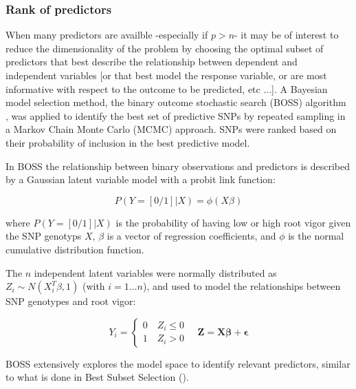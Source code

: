 \subsubsection{Rank of predictors}
\label{par:boss}
When many predictors are availble -especially if $p>n$- it may be
of interest to reduce the dimensionality of the problem by choosing the
optimal subset of predictors that best describe the relationship between
dependent and independent variables [or that best model the response
variable, or are most informative with respect to the outcome to be
predicted, etc ...].
A Bayesian model selection method, the binary outcome stochastic search
(BOSS) algorithm \cite{russu2012stochastic}, was applied to identify the best set of predictive
SNPs by repeated sampling in a Markov Chain Monte
Carlo (MCMC) approach.  
SNPs were ranked based on their probability of inclusion in the best
predictive model.
 
In BOSS the relationship between binary observations and predictors is
described by a Gaussian latent variable model with a probit link function:

\begin{equation}
P(Y=[0/1]|X)=\phi(X \beta)
\label{eq:probit}
\end{equation} 

where $P(Y=[0/1]|X)$ is the probability of having low or high root vigor
given the SNP genotyps $X$, $\beta$ is a vector of regression
coefficients, and $\phi$ is the normal cumulative distribution function. 

The $n$ independent latent variables were normally distributed as $Z_i \sim
N(X_i^T\beta,1)$ (with $i=1 \ldots n$), and used to model the relationships between SNP genotypes and root vigor:

\begin{equation}
Y_i = \left\{ 
\begin{array}{ll}
0 \quad Z_i \leq 0 \\
1 \quad Z_i > 0
\end{array}
\right.
\quad \mathbf{Z}=\mathbf{X\beta+\epsilon}
\label{eq:threshold}
\end{equation}

BOSS extensively explores the model space to identify relevant
predictors, similar to what is done in Best Subset Selection (\cite{hastie2009model}).


